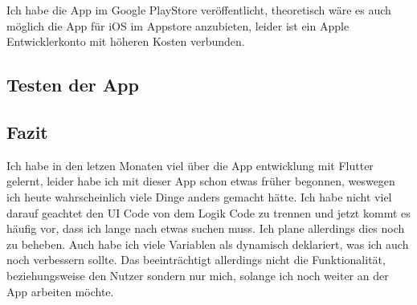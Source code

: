 Ich habe die App im Google PlayStore veröffentlicht, theoretisch wäre es auch möglich die App für iOS im Appstore anzubieten, leider ist ein Apple Entwicklerkonto mit höheren Kosten verbunden.

\subsection{Testen der App}

\subsection{Fazit}

Ich habe in den letzen Monaten viel über die App entwicklung mit Flutter gelernt, leider habe ich mit dieser App schon etwas früher begonnen, weswegen ich heute wahrscheinlich viele Dinge anders gemacht hätte. Ich habe nicht viel darauf geachtet den UI Code von dem Logik Code zu trennen und jetzt kommt es häufig vor, dass ich lange nach etwas suchen muss. Ich plane allerdings dies noch zu beheben. Auch habe ich viele Variablen als dynamisch deklariert, was ich auch noch verbessern sollte. Das beeinträchtigt allerdings nicht die Funktionalität, beziehungsweise den Nutzer sondern nur mich, solange ich noch weiter an der App arbeiten möchte.